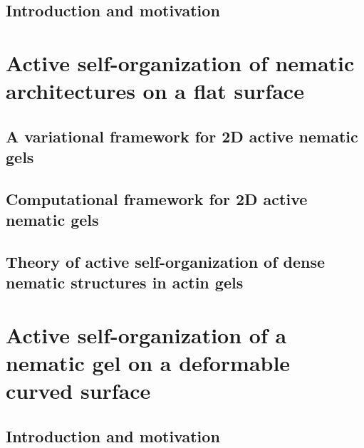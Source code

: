 \documentclass[11pt, final, a4paper, twoside, openright]{book}
\begin{document}
\InitializeThesis

 



\frontmatter





\mainmatter
%
\renewcommand{\thesection}{1.\arabic{section}}
\chapter{Introduction and motivation} \label{chap_1}


\renewcommand{\thesection}{2.\arabic{section}}
\part{Active self-organization of nematic architectures on a flat surface}
\chapter{A variational framework for 2D active nematic gels} \label{chap_2}


\renewcommand{\thesection}{3.\arabic{section}}
\chapter{Computational framework for 2D active nematic gels} \label{chap_3}


\renewcommand{\thesection}{4.\arabic{section}}
\chapter{Theory of active self-organization of dense nematic structures in actin gels} \label{chap_4}


\part{Active self-organization of a nematic gel on a deformable curved surface} 

\renewcommand{\thesection}{5.\arabic{section}}
\chapter{Introduction and  motivation}  \label{chap_6}

\end{document}
